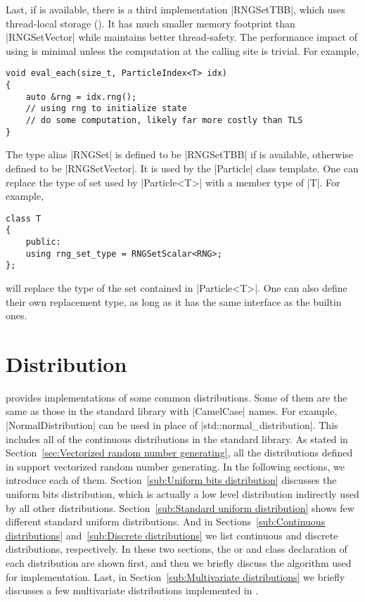 Last, if \tbb is available, there is a third implementation |RNGSetTBB|, which
uses thread-local storage (\tls). It has much smaller memory footprint than
|RNGSetVector| while maintains better thread-safety. The performance impact of
using \tls is minimal unless the computation at the calling site is trivial.
For example,
\begin{Verbatim}
void eval_each(size_t, ParticleIndex<T> idx)
{
    auto &rng = idx.rng();
    // using rng to initialize state
    // do some computation, likely far more costly than TLS
}
\end{Verbatim}
The type alias |RNGSet| is defined to be |RNGSetTBB| if \tbb is available,
otherwise defined to be |RNGSetVector|. It is used by the |Particle| class
template. One can replace the type of \rng set used by |Particle<T>| with a
member type of |T|. For example,
\begin{Verbatim}
class T
{
    public:
    using rng_set_type = RNGSetScalar<RNG>;
};
\end{Verbatim}
will replace the type of the \rng set contained in |Particle<T>|. One can also
define their own replacement type, as long as it has the same interface as the
builtin ones.

\section{Distribution}
\label{sec:Distribution}

\mckl provides implementations of some common distributions. Some of them are
the same as those in the standard library with |CamelCase| names. For example,
|NormalDistribution| can be used in place of |std::normal_distribution|. This
includes all of the continuous distributions in the standard library. As stated
in Section~\ref{sec:Vectorized random number generating}, all the distributions
defined in \mckl support vectorized random number generating. In the following
sections, we introduce each of them. Section~\ref{sub:Uniform bits
distribution} discusses the uniform bits distribution, which is actually a low
level distribution indirectly used by all other distributions.
Section~\ref{sub:Standard uniform distribution} shows few different standard
uniform distributions. And in Sections~\ref{sub:Continuous distributions}
and~\ref{sub:Discrete distributions} we list continuous and discrete
distributions, respectively. In these two sections, the \pdf or \pmf and class
declaration of each distribution are shown first, and then we briefly discuss
the algorithm used for implementation. Last, in Section~\ref{sub:Multivariate
distributions} we briefly discusses a few multivariate distributions
implemented in \mckl.

